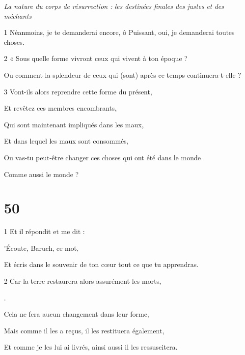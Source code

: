 \par \textit{La nature du corps de résurrection : les destinées finales des justes et des méchants}

\par 1 Néanmoins, je te demanderai encore, ô Puissant, oui, je demanderai toutes choses.

\par 2 « Sous quelle forme vivront ceux qui vivent à ton époque ?

\par Ou comment la splendeur de ceux qui (sont) après ce temps continuera-t-elle ?

\par 3 Vont-ils alors reprendre cette forme du présent,

\par Et revêtez ces membres encombrants,

\par Qui sont maintenant impliqués dans les maux,

\par Et dans lequel les maux sont consommés,

\par Ou vas-tu peut-être changer ces choses qui ont été dans le monde

\par Comme aussi le monde ?

\chapter{50}

\par 1 Et il répondit et me dit :

\par 'Écoute, Baruch, ce mot,

\par Et écris dans le souvenir de ton cœur tout ce que tu apprendras.

\par 2 Car la terre restaurera alors assurément les morts,

\par [Qu'il reçoit maintenant, afin de les conserver].

\par Cela ne fera aucun changement dans leur forme,

\par Mais comme il les a reçus, il les restituera également,

\par Et comme je les lui ai livrés, ainsi aussi il les ressuscitera.

